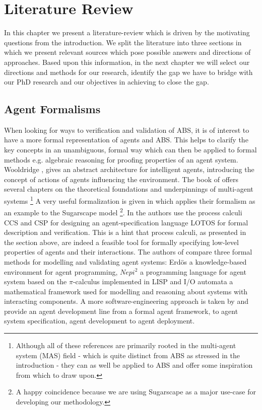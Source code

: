 \chapter{Literature Review}
\label{chap:literature}

In this chapter we present a literature-review which is driven by the motivating questions from the introduction. We split the literature into three sections in which we present relevant sources which pose possible answers and directions of approaches. Based upon this information, in the next chapter we will select our directions and methods for our research, identify the gap we have to bridge with our PhD research and our objectives in achieving to close the gap.

\section{Agent Formalisms}
When looking for ways to verification and validation of ABS, it is of interest to have a more formal representation of agents and ABS. This helps to clarify the key concepts in an unambiguous, formal way which can then be applied to formal methods e.g. algebraic reasoning for proofing properties of an agent system. Wooldridge \cite{wooldridge_introduction_2009}, \cite{wooldridge_intelligent_1995} gives an abstract architecture for intelligent agents, introducing the concept of actions of agents influencing the environment. The book of \cite{weiss_multiagent_2013} offers several chapters on the theoretical foundations and underpinnings of multi-agent systems \footnote{Although all of these references are primarily rooted in the multi-agent system (MAS) field - which is quite distinct from ABS as stressed in the introduction - they can as well be applied to ABS and offer some inspiration from which to draw upon.}
A very useful formalization is given in \cite{klugl_amason:_2013} which applies their formalism as an example to the Sugarscape model \cite{epstein_growing_1996} \footnote{A happy coincidence because we are using Sugarscape as a major use-case for developing our methodology.}.
In \cite{carchiolo_using_2000} the authors use the process calculi CCS and CSP for designing an agent-specification language LOTOS for formal description and verification. This is a hint that process calculi, as presented in the section above, are indeed a feasible tool for formally specifying low-level properties of agents and their interactions.
The authors of \cite{araragi_formal_2000} compare three formal methods for modelling and validating agent systems: Erdös a knowledge-based environment for agent programming, $Nepi^2$ a programming language for agent system based on the $\pi$-calculus implemented in LISP and I/O automata a mathematical framework used for modelling and reasoning about systems with interacting components.
A more software-engineering approach is taken by \cite{dinverno_formal_2000} and provide an agent development line from a formal agent framework, to agent system specification, agent development to agent deployment. 

